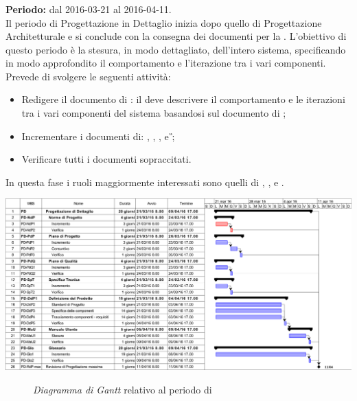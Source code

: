 \subsubsection{\PD}
\textbf{Periodo:} dal 2016-03-21 al 2016-04-11. \\
Il periodo di Progettazione in Dettaglio inizia dopo quello di Progettazione Architetturale e si conclude con la consegna dei documenti per la \RP. L'obiettivo di questo periodo è la stesura, in modo dettagliato, dell'intero sistema, specificando in modo approfondito il comportamento e l'iterazione tra i vari componenti. \\
Prevede di svolgere le seguenti attività:
\begin{itemize}
	\item Redigere il documento di \textit{\DDP}: il \textit{\Prog} deve descrivere il comportamento e le iterazioni tra i vari componenti del sistema basandosi sul documento di \textit{\ST};
	\item Incrementare i documenti di: \textit{\NdP}, \textit{\PdP}, \textit{\PdQ}, \textit{\ST} e \textit{\G};
	\item Verificare tutti i documenti sopraccitati.
\end{itemize}
In questa fase i ruoli maggiormente interessati sono quelli di \textit{\Amm}, \textit{\Res}, \textit{\Prog} e \textit{\Ver}.
\begin{center}
	\includegraphics[keepaspectratio = true, width=16cm]{immagini/PdP_ProgettazioneDiDettaglioGantt.png}
\end{center}
\begin{figure}[h]
	\caption{\textit{Diagramma di Gantt} relativo al periodo di \PD}\label{etichetta}
\end{figure}

